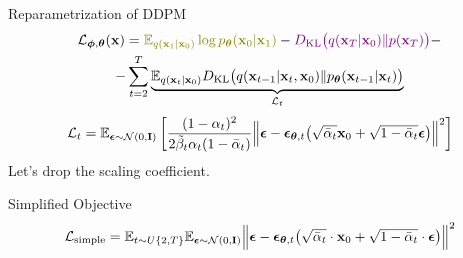 \documentclass{beamer}
\begin{document}
\begin{frame}{Reparametrization of DDPM}
    \begin{multline*}
        \cL_{\bphi, \btheta}(\bx) =  {\color{olive}\bbE_{q(\bx_1 | \bx_0)} \log \pt(\bx_0 | \bx_1)} - {\color{violet}\KL\bigl(q(\bx_T | \bx_0) \| p(\bx_T)\bigr)} - \\
        - \sum_{t=2}^T \underbrace{ \bbE_{q(\bx_t | \bx_0)} \KL \bigl(q(\bx_{t-1} | \bx_t, \bx_0) \| \pt(\bx_{t-1} | \bx_t)\bigr)}_{\cL_t}
    \end{multline*}
    \eqpause
    \vspace{-0.3cm}
    \[
        \mathcal{L}_t  = \mathbb{E}_{\boldsymbol{\epsilon} \sim \mathcal{N}(0, \mathbf{I})} \left[ \frac{(1 - \alpha_t)^2}{2\tilde{\beta}_t \alpha_t (1 - \bar{\alpha}_t)} \Bigl\| \boldsymbol{\epsilon} - \boldsymbol{\epsilon}_{\boldsymbol{\theta}, t}\bigl( \sqrt{\bar{\alpha}_t} \mathbf{x}_0 + \sqrt{1 - \bar{\alpha}_t} \boldsymbol{\epsilon}\bigr) \Bigr\|^2 \right]
    \]
    \eqpause
    Let's drop the scaling coefficient.
    \begin{block}{Simplified Objective}
        \vspace{-0.3cm}
        \[
             \mathcal{L}_{\text{simple}} = \mathbb{E}_{t \sim U\{2, T\}} \mathbb{E}_{\boldsymbol{\epsilon} \sim \mathcal{N}(0, \mathbf{I})} \Bigl\| \boldsymbol{\epsilon} - \boldsymbol{\epsilon}_{\boldsymbol{\theta}, t}\bigl( \sqrt{\bar{\alpha}_t} \cdot \mathbf{x}_0 + \sqrt{1 - \bar{\alpha}_t} \cdot \boldsymbol{\epsilon}\bigr) \Bigr\|^2 
        \]
    \end{block}
\end{frame}
\end{document}

